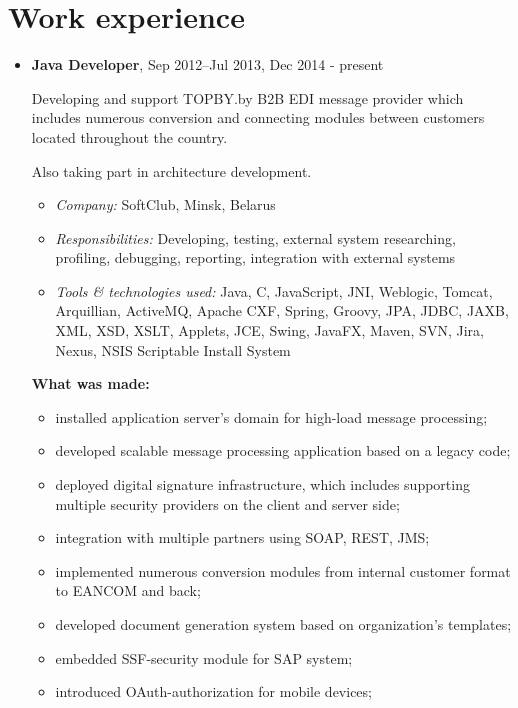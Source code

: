 \documentclass[a4paper, 12pt]{article}
\newcommand{\position}[1]{
    \textbf{#1}}
\newcommand{\itemlabel}[1]{
    \textit{#1:}}
\begin{document}
\section*{Work experience}

    \begin{itemize}

   
        \item \position{Java Developer}, Sep 2012--Jul 2013, Dec 2014 - present

            Developing and support TOPBY.by B2B EDI message provider which includes numerous conversion and connecting modules between customers located throughout the country.

            Also taking part in architecture development.
            	
            \begin{itemize}
                \item \itemlabel{Company} SoftClub, Minsk, Belarus
                \item \itemlabel{Responsibilities} Developing, testing, external system researching, profiling, debugging, reporting, integration with external systems
                \item \itemlabel{Tools \& technologies used} Java, C, JavaScript, JNI, Weblogic, Tomcat, Arquillian, ActiveMQ, Apache CXF, Spring, Groovy, JPA, JDBC, JAXB, XML, XSD, XSLT, Applets, JCE, Swing, JavaFX, Maven, SVN, Jira, Nexus, NSIS Scriptable Install System
            \end{itemize}
            
            \textbf{What was made:}
			\begin{itemize}
  				\item installed application server's domain for high-load message processing;
  				\item developed scalable message processing application based on a legacy code;
				\item deployed digital signature infrastructure, which includes supporting multiple security providers on the client and server side;
  				\item integration with multiple partners using SOAP, REST, JMS;
  				\item implemented numerous conversion modules from internal customer format to EANCOM and back;
  				\item developed document generation system based on organization's templates;
  				\item embedded SSF-security module for SAP system;
  				\item introduced OAuth-authorization for mobile devices;
			\end{itemize}
            

\end{itemize}
\end{document}
